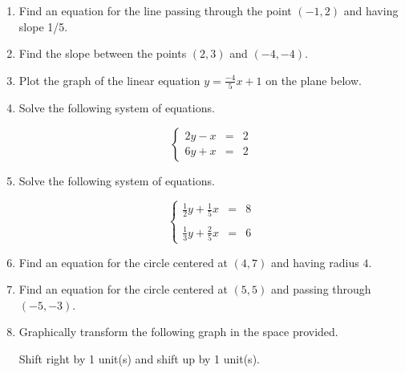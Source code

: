 \documentclass{article}
\begin{document}
\ReviewTitle[class={College Algebra}, for={Test 2}]

\begin{enumerate}
\item Find an equation for the line passing through the point $(-1, 2)$ and having slope 1/5. \vspace{5cm}

\item Find the slope between the points $(2, 3)$ and $(-4, -4)$. \vspace{5cm}

\item Plot the graph of the linear equation $y = \frac{-4}{5} x + 1$ on the plane below.\begin{center}
\CartesianPlane[h=7,w=7,axes=yes]
\end{center}

  

\newpage

\item Solve the following system of equations.

\[ \left\{ \begin{array}{rcl} 2y - x & = & 2 \\ 6y + x & = & 2 \end{array} \right. \] \vspace{5cm}

\item Solve the following system of equations.

\[ \left\{ \begin{array}{rcl} \frac{1}{2}y + \frac{1}{5}x & = & 8 \\ & & \\ \frac{1}{3}y + \frac{2}{5}x & = & 6 \end{array} \right. \] \vspace{5cm}

\item Find an equation for the circle centered at $(4, 7)$ and having radius $4$. \vspace{2cm}

\item Find an equation for the circle centered at $(5, 5)$ and passing through $(-5, -3)$. \vspace{5cm}

\newpage

\item Graphically transform the following graph in the space provided.

\begin{center}
Shift right by 1 unit(s) and shift up by 1 unit(s).
\end{center}


\end{enumerate}
\end{document}
